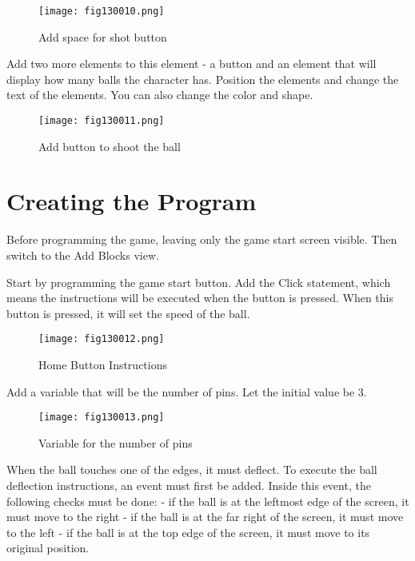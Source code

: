 \begin{figure}[H]
   \centering
   \texttt{[image: fig130010.png]}
   \caption{Add space for shot button}
\label{fig130010}
\end{figure}

Add two more elements to this element - a button and an element that will display how many balls the character has. Position the elements and change the text of the elements. You can also change the color and shape.

\begin{figure}[H]
   \centering
   \texttt{[image: fig130011.png]}
   \caption{Add button to shoot the ball}
\label{fig130011}
\end{figure}

\section{Creating the Program}

Before programming the game, leaving only the game start screen visible. Then switch to the Add Blocks view.

Start by programming the game start button. Add the Click statement, which means the instructions will be executed when the button is pressed. When this button is pressed, it will set the speed of the ball.

\begin{figure}[H]
   \centering
   \texttt{[image: fig130012.png]}
   \caption{Home Button Instructions}
\label{fig130012}
\end{figure}

Add a variable that will be the number of pins. Let the initial value be 3.

\begin{figure}[H]
   \centering
   \texttt{[image: fig130013.png]}
   \caption{Variable for the number of pins}
\label{fig130013}
\end{figure}

When the ball touches one of the edges, it must deflect. To execute the ball deflection instructions, an event must first be added. Inside this event, the following checks must be done:
- if the ball is at the leftmost edge of the screen, it must move to the right
- if the ball is at the far right of the screen, it must move to the left
- if the ball is at the top edge of the screen, it must move to its original position.

